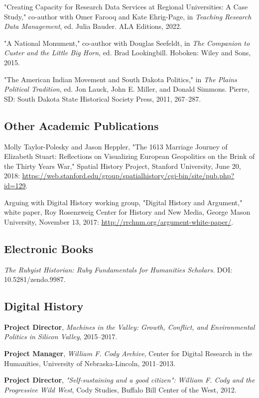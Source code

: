 \documentclass[10pt]{article}
\begin{document}
"Creating Capacity for Research Data Services at Regional Universities: A Case Study," co-author with Omer Farooq and Kate Ehrig-Page, in \textit{Teaching Research Data Management}, ed. Julia Bauder. ALA Editions, 2022.

"A National Monument," co-author with Douglas Seefeldt, in \textit{The Companion to Custer and the Little Big Horn}, ed. Brad Lookingbill. Hoboken: Wiley and Sons, 2015.

"The American Indian Movement and South Dakota Politics," in \textit{The Plains Political Tradition}, ed. Jon Lauck, John E. Miller, and Donald Simmons. Pierre, SD: South Dakota State Historical Society Press, 2011, 267--287.

\subsection{Other Academic Publications}

Molly Taylor-Polesky and Jason Heppler, "The 1613 Marriage Journey of Elizabeth Stuart: Reflections on Visualizing European Geopolitics on the Brink of the Thirty Years War," Spatial History Project, Stanford University, June 20, 2018: \url{https://web.stanford.edu/group/spatialhistory/cgi-bin/site/pub.php?id=129}.

Arguing with Digital History working group, "Digital History and Argument," white paper, Roy Rosenzweig Center for History and New Media, George Mason University, November 13, 2017: \url{http://rrchnm.org/argument-white-paper/}.

\subsection{Electronic Books}

\textit{The Rubyist Historian: Ruby Fundamentals for Humanities Scholars}. DOI: 10.5281/zendo.9987.

\subsection{Digital History}

\textbf{Project Director}, \textit{Machines in the Valley: Growth, Conflict, and Environmental Politics in Silicon Valley}, 2015--2017.

\textbf{Project Manager}, \textit{William F. Cody Archive}, Center for Digital Research in the Humanities, University of Nebraska-Lincoln, 2011--2013.

\textbf{Project Director}, \textit{"Self-sustaining and a good citizen": William F. Cody and the Progressive Wild West}, Cody Studies, Buffalo Bill Center of the West, 2012.
\end{document}
